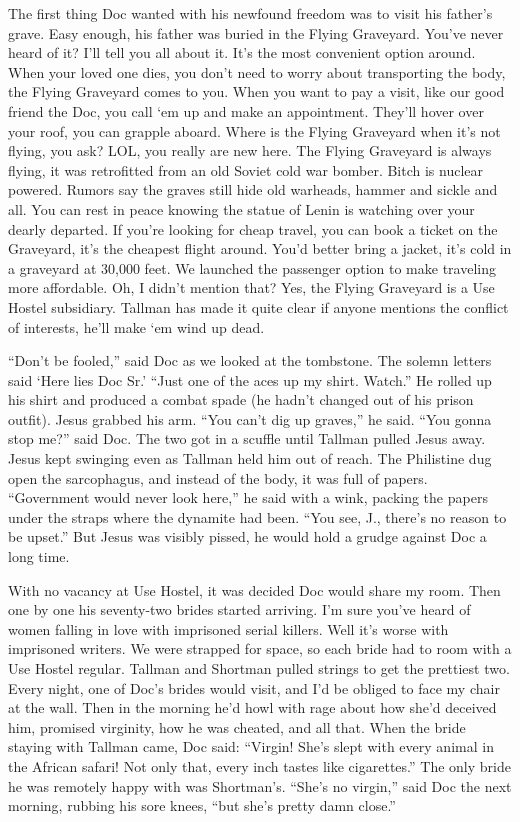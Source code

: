 \documentclass[oneside]{book}
\begin{document}
The first thing Doc wanted with his newfound freedom was to visit
his father's grave.  Easy enough, his father was buried in the Flying
Graveyard.  You've never heard of it?  I'll tell you all about it.  It's the most
convenient option around.  When your loved one dies, you don't need to worry about
transporting the body, the Flying Graveyard comes to you.  When you
want to pay a visit, like our good friend the Doc, you call `em up and make
an appointment.  They'll hover over your roof,
you can grapple aboard.  Where is the Flying Graveyard when it's
not flying, you ask?  LOL, you really are new here.  The Flying Graveyard is always
flying, it was retrofitted from an old Soviet cold war bomber.  Bitch is nuclear
powered.  Rumors say the
graves still hide old warheads, hammer and sickle and all.  You can rest in peace knowing
the statue of Lenin is watching over your dearly departed.  If
you're looking for cheap travel, you can book a ticket on the Graveyard,
it's the cheapest flight around.  You'd better bring a jacket, it's cold in a
graveyard at 30,000 feet.  We launched the passenger option
to make traveling more affordable.  Oh, I didn't mention that?
Yes, the Flying Graveyard is a Use Hostel subsidiary.  Tallman has made it quite clear
if anyone mentions the conflict of interests, he'll make `em wind up dead.

``Don't be fooled,'' said Doc as we looked at the tombstone.
The solemn letters said `Here lies Doc Sr.'  ``Just one of the aces up my shirt.
Watch.''  He rolled up his shirt and produced a combat spade (he hadn't changed
out of his prison outfit).
Jesus grabbed his arm.  ``You can't dig up graves,'' he said.
``You gonna stop me?'' said Doc.  The two got in a scuffle until Tallman pulled Jesus
away.  Jesus kept swinging even as Tallman held him out of reach.
The Philistine dug open the sarcophagus,
and instead of the body, it was full of papers.  ``Government would never look
here,'' he said with a wink, packing the papers under the straps where the
dynamite had been.  ``You see, J., there's no reason to be upset.''  But Jesus was
visibly pissed, he would hold a grudge against Doc a long time.

With no vacancy at Use Hostel, it was decided Doc would share my room.
Then one by one his seventy-two brides started arriving.  I'm sure you've heard of
women falling in love with imprisoned serial killers.  Well it's
worse with imprisoned writers.  We were strapped for space, so each bride had to
room with a Use Hostel regular.  Tallman and
Shortman pulled strings to get the prettiest two.  Every night, one of Doc's
brides would visit, and I'd be obliged to face my chair at the wall.
Then in the morning he'd howl with rage about how she'd deceived him, promised
virginity, how he was cheated, and all that.  When the bride staying with Tallman
came, Doc said:  ``Virgin!  She's slept with every animal in the African safari!
Not only that, every inch tastes like cigarettes.''
The only bride he was remotely happy with was Shortman's.
``She's no virgin,'' said Doc the next morning, rubbing his sore knees,
``but she's pretty damn close.''
\end{document}
